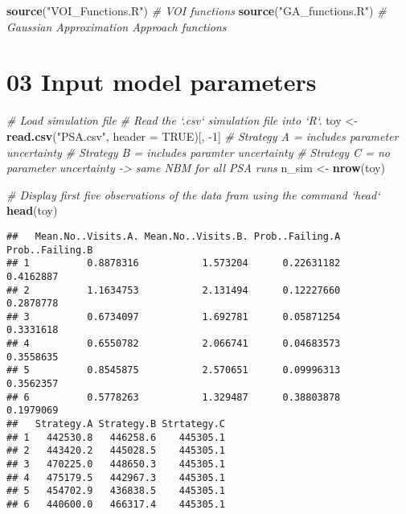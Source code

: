 \documentclass[
]{article}
\newenvironment{Shaded}{\begin{snugshade}}{\end{snugshade}}
\newcommand{\CommentTok}[1]{\textcolor[rgb]{0.56,0.35,0.01}{\textit{#1}}}
\newcommand{\DataTypeTok}[1]{\textcolor[rgb]{0.13,0.29,0.53}{#1}}
\newcommand{\DecValTok}[1]{\textcolor[rgb]{0.00,0.00,0.81}{#1}}
\newcommand{\KeywordTok}[1]{\textcolor[rgb]{0.13,0.29,0.53}{\textbf{#1}}}
\newcommand{\NormalTok}[1]{#1}
\newcommand{\OtherTok}[1]{\textcolor[rgb]{0.56,0.35,0.01}{#1}}
\newcommand{\StringTok}[1]{\textcolor[rgb]{0.31,0.60,0.02}{#1}}
\begin{document}
\begin{Shaded}
\begin{Highlighting}[]
\KeywordTok{source}\NormalTok{(}\StringTok{"VOI_Functions.R"}\NormalTok{) }\CommentTok{# VOI functions }
\KeywordTok{source}\NormalTok{(}\StringTok{"GA_functions.R"}\NormalTok{)  }\CommentTok{# Gaussian Approximation Approach functions}
\end{Highlighting}
\end{Shaded}

\hypertarget{input-model-parameters}{%
\section{03 Input model parameters}\label{input-model-parameters}}

\begin{Shaded}
\begin{Highlighting}[]
\CommentTok{# Load simulation file}
\CommentTok{# Read the `.csv` simulation file into `R`.}
\NormalTok{toy   <-}\StringTok{ }\KeywordTok{read.csv}\NormalTok{(}\StringTok{"PSA.csv"}\NormalTok{, }\DataTypeTok{header =} \OtherTok{TRUE}\NormalTok{)[, }\DecValTok{-1}\NormalTok{]}
\CommentTok{# Strategy A = includes parameter uncertainty}
\CommentTok{# Strategy B = includes paramter uncertainty}
\CommentTok{# Strategy C = no parameter uncertainty -> same NBM for all PSA runs}
\NormalTok{n_sim <-}\StringTok{ }\KeywordTok{nrow}\NormalTok{(toy)}

\CommentTok{# Display first five observations of the data fram using the command `head`}
\KeywordTok{head}\NormalTok{(toy)}
\end{Highlighting}
\end{Shaded}

\begin{verbatim}
##   Mean.No..Visits.A. Mean.No..Visits.B. Prob..Failing.A Prob..Failing.B
## 1          0.8878316           1.573204      0.22631182       0.4162887
## 2          1.1634753           2.131494      0.12227660       0.2878778
## 3          0.6734097           1.692781      0.05871254       0.3331618
## 4          0.6550782           2.066741      0.04683573       0.3558635
## 5          0.8545875           2.570651      0.09996313       0.3562357
## 6          0.5778263           1.329487      0.38803878       0.1979069
##   Strategy.A Strategy.B Strtategy.C
## 1   442530.8   446258.6    445305.1
## 2   443420.2   445028.5    445305.1
## 3   470225.0   448650.3    445305.1
## 4   475179.5   442967.3    445305.1
## 5   454702.9   436838.5    445305.1
## 6   440600.0   466317.4    445305.1
\end{verbatim}
\end{document}
